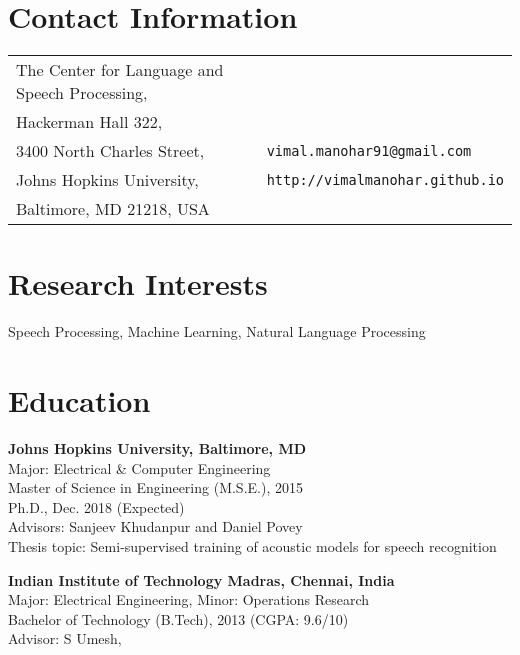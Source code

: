 \documentclass[margin,line,pifont,palatino,courier]{res}
\begin{document}

\begin{resume}

\section{\sc Contact Information}

\vspace{.05in}
\begin{tabular}{l l}
The Center for Language and Speech Processing, \\
Hackerman Hall 322,\\
3400 North Charles Street,                        & \verb+vimal.manohar91@gmail.com+\\
Johns Hopkins University,                  & \verb+http://vimalmanohar.github.io+\\
Baltimore, MD 21218, USA               & \\
\end{tabular}

\section{\sc Research Interests}
Speech Processing, Machine Learning, Natural Language Processing

\section{\sc Education}

\textbf{Johns Hopkins University, Baltimore, MD} \\
Major: Electrical \& Computer Engineering \\
Master of Science in Engineering (M.S.E.), 2015\\
Ph.D., Dec. 2018 (Expected) \\
Advisors: Sanjeev Khudanpur and Daniel Povey \\
Thesis topic: Semi-supervised training of acoustic models for speech recognition

\textbf{Indian Institute of Technology Madras, Chennai, India} \\
Major: Electrical Engineering, \quad Minor: Operations Research \\
Bachelor of Technology (B.Tech), 2013 (CGPA: 9.6/10) \\
Advisor: S Umesh, \\


\end{resume}
\end{document}
